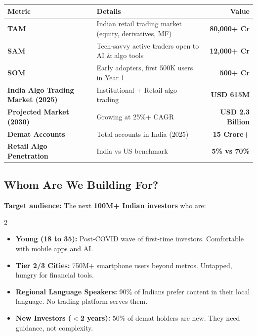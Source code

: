 \documentclass[11pt,a4paper]{article}
\newcommand{\rupee}{\text{\textrupee}}
\begin{document}
\begin{statbox}
\begin{tabularx}{\textwidth}{>{\bfseries}lXr}
\toprule
\textbf{Metric} & \textbf{Details} & \textbf{Value} \\
\midrule
TAM & Indian retail trading market (equity, derivatives, MF) & \textcolor{primary}{\textbf{\rupee 80,000+ Cr}} \\
SAM & Tech-savvy active traders open to AI \& algo tools & \textcolor{headerblue}{\textbf{\rupee 12,000+ Cr}} \\
SOM & Early adopters, first 500K users in Year 1 & \textcolor{purpleaccent}{\textbf{\rupee 500+ Cr}} \\
\addlinespace
India Algo Trading Market (2025) & Institutional + Retail algo trading & \textcolor{primary}{\textbf{USD 615M}} \\
Projected Market (2030) & Growing at 25\%+ CAGR & \textcolor{primary}{\textbf{USD 2.3 Billion}} \\
Demat Accounts & Total accounts in India (2025) & \textcolor{primary}{\textbf{15 Crore+}} \\
Retail Algo Penetration & India vs US benchmark & \textcolor{accent}{\textbf{5\% vs 70\%}} \\
\bottomrule
\end{tabularx}
\end{statbox}

\subsection{Whom Are We Building For?}

\textbf{Target audience:} The next \textbf{100M+ Indian investors} who are:

\begin{multicols}{2}
\begin{itemize}[leftmargin=*]
    \item \textbf{Young (18 to 35):} Post-COVID wave of first-time investors. Comfortable with mobile apps and AI.
    \item \textbf{Tier 2/3 Cities:} 750M+ smartphone users beyond metros. Untapped, hungry for financial tools.
    \item \textbf{Regional Language Speakers:} 90\% of Indians prefer content in their local language. No trading platform serves them.
    \item \textbf{New Investors ($<$2 years):} 50\% of demat holders are new. They need guidance, not complexity.
\end{itemize}
\end{multicols}
\end{document}
